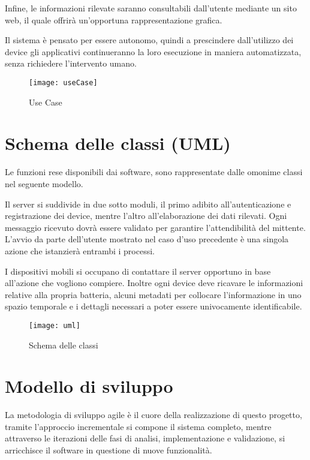 \documentclass[target=bach]{thud}
\begin{document}
    Infine, le informazioni rilevate saranno consultabili dall'utente mediante un sito web, il quale offrirà un'opportuna rappresentazione grafica.

    Il sistema è pensato per essere autonomo, quindi a prescindere dall'utilizzo dei device gli applicativi continueranno la loro esecuzione in maniera automatizzata, senza richiedere l'intervento umano.


\graphicspath{ {./img/} }
\begin{figure}[h]
\texttt{[image: useCase]}
\caption{Use Case}
\label{fig:usecase}
\centering
\end{figure}


\section{Schema delle classi (UML)}

    Le funzioni rese disponibili dai software, sono rappresentate dalle omonime classi nel seguente modello.

    Il server si suddivide in due sotto moduli, il primo adibito all'autenticazione e registrazione dei device, mentre l'altro all'elaborazione dei dati rilevati. Ogni messaggio ricevuto dovrà essere validato per garantire l'attendibilità del mittente.
    L’avvio da parte dell’utente mostrato nel caso d’uso precedente è una singola azione che istanzierà entrambi i processi.


    I dispositivi mobili si occupano di contattare il server opportuno in base all'azione che vogliono compiere. Inoltre ogni device deve ricavare le informazioni relative alla propria batteria, alcuni metadati per collocare l'informazione in uno spazio temporale e i dettagli necessari a poter essere univocamente identificabile.

    \begin{figure}[h]
    	\centering
    	\texttt{[image: uml]}
    	\caption{Schema delle classi}
    	\label{fig:uml}
    \end{figure}

\newpage

\section{Modello di sviluppo}

    La metodologia di sviluppo agile è il cuore della realizzazione di questo progetto, tramite l'approccio incrementale si compone il sistema completo, mentre attraverso le iterazioni delle fasi di analisi, implementazione e validazione, si arricchisce il software in questione di nuove funzionalità.
\end{document}
